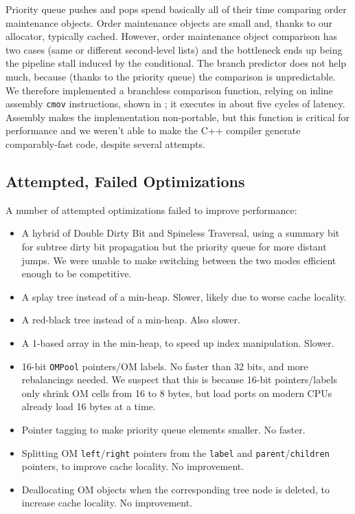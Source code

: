 Priority queue pushes and pops spend basically all of their time
  comparing order maintenance objects.
Order maintenance objects are small and,
  thanks to our allocator, typically cached.
However, order maintenance object comparison has two cases
  (same or different second-level lists)
  and the bottleneck ends up being the pipeline stall
  induced by the conditional.
The branch predictor does not help much,
  because (thanks to the priority queue) the comparison is unpredictable.
We therefore implemented a branchless comparison function,
  relying on inline assembly \texttt{cmov} instructions,
  shown in ;
  it executes in about five cycles of latency.
Assembly makes the implementation non-portable,
  but this function is critical for performance
  and we weren't able to make the C++ compiler
  generate comparably-fast code, despite several attempts.

\subsection{Attempted, Failed Optimizations}

A number of attempted optimizations
  failed to improve performance:
\begin{itemize}
\item A hybrid of Double Dirty Bit and Spineless Traversal,
    using a summary bit for subtree dirty bit propagation
    but the priority queue for more distant jumps.
  We were unable to make switching between the two modes
    efficient enough to be competitive.
\item A splay tree instead of a min-heap.
  Slower, likely due to worse cache locality.
\item A red-black tree instead of a min-heap. Also slower.
\item A 1-based array in the min-heap, to speed up index manipulation.
  Slower.
\item 16-bit \texttt{OMPool} pointers/OM labels.
  No faster than 32 bits, and more rebalancings needed.
  We suspect that this is because 16-bit pointers/labels
  only shrink OM cells from 16 to 8 bytes,
  but load ports on modern CPUs already load 16 bytes at a time.
\item Pointer tagging to make priority queue elements smaller.
  No faster.
\item Splitting OM \texttt{left}/\texttt{right} pointers
  from the \texttt{label} and \texttt{parent}/\texttt{children} pointers, to improve cache locality. No improvement.
\item Deallocating OM objects when the corresponding tree node is deleted, to increase cache locality. No improvement.
\end{itemize}
